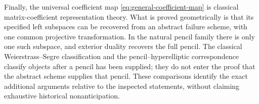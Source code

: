 Finally, the universal coefficient map
\eqref{eq:general-coefficient-map} is classical matrix-coefficient
representation theory.  What is proved geometrically is that its
specified left subspaces can be recovered from an abstract failure
scheme, with one common projective transformation.  In the natural
pencil family there is only one such subspace, and exterior duality
recovers the full pencil.  The classical Weierstrass--Segre
classification and the pencil--hyperelliptic correspondence classify
objects after a pencil has been supplied; they do not enter the proof
that the abstract scheme supplies that pencil.  These comparisons
identify the exact additional arguments relative to the inspected
statements, without claiming exhaustive historical nonanticipation.
